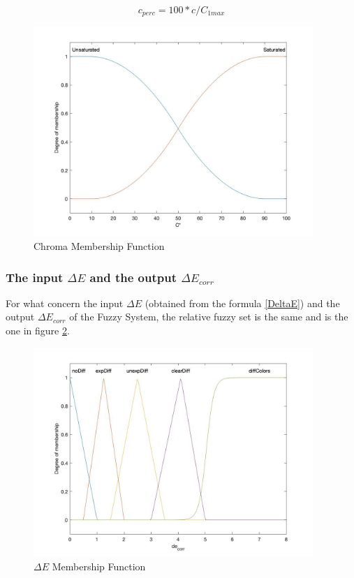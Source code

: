 \documentclass{article}
\begin{document}
\begin{equation}\label{fig:cperc}
	c_{perc}=100*c/C_{1max}
\end{equation}

\begin{figure}[!h]
	\center
 	\includegraphics[width=300pt]{./img/inputFuzzyCperc.jpg}
  	\caption{Chroma Membership Function}\label{fig:Chroma}
\end{figure}

\subsubsection{The input $\Delta E$ and the output $\Delta E_{corr}$} 

For what concern the input $\Delta E$ (obtained from the formula \ref{DeltaE}) and the output $\Delta E_{corr}$ of the Fuzzy System, the relative fuzzy set is the same and is the one in figure \ref{fig:deltaemf}.

\begin{figure}[!h]
	\center
 	\includegraphics[width=300pt]{./img/outputFuzzyDelta}
  	\caption{$\Delta E$ Membership Function}\label{fig:deltaemf}
\end{figure}
\end{document}
